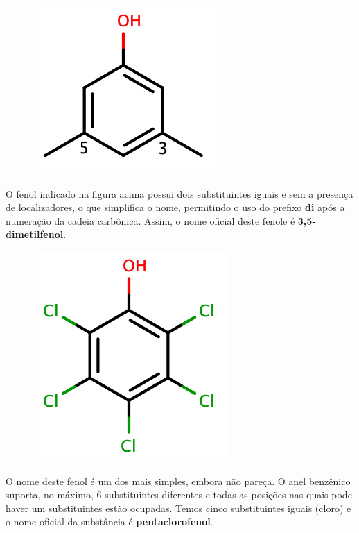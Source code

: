 \begin{tcolorbox}[colback=white!5!white,colframe=orange!90!black,title=\textbf{Exemplo 6}]
	\begin{figure}[h]
		\centering
		\includegraphics[width=0.45\linewidth]{imagens/dmf.png}
		\label{fig:2metilhex}
	\end{figure}
	\tcblower
	O fenol indicado na figura acima possui dois substituintes iguais e sem a presença de localizadores, o que simplifica o nome, permitindo o uso do prefixo \textbf{di} após a numeração da cadeia carbônica. Assim, o nome oficial deste fenole é \textbf{3,5-dimetilfenol}.
\end{tcolorbox}

\begin{tcolorbox}[colback=white!5!white,colframe=orange!90!black,title=\textbf{Exemplo 7}]
	\begin{figure}[h]
		\centering
		\includegraphics[width=0.3\linewidth]{imagens/pcf.png}
		\label{fig:2metilhex}
	\end{figure}
	\tcblower
	O nome deste fenol é um dos mais simples, embora não pareça. O anel benzênico suporta, no máximo, 6 substituintes diferentes e todas as posições nas quais pode haver um substituintes estão ocupadas. Temos cinco substituintes iguais (cloro) e o nome oficial da substância é \textbf{pentaclorofenol}.
\end{tcolorbox}

